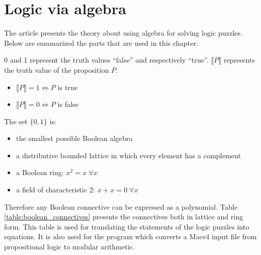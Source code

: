 \section{Logic via algebra} 

The article \cite{Ciraulo2020algebra} presents the theory about using algebra for solving logic puzzles. Below are summarized the parts that are used in this chapter.

0 and 1 represent the truth values ``false'' and respectively ``true''. $\llbracket P \rrbracket$ represents the truth value of the proposition $P$.

\begin{itemize}

\item $\llbracket P \rrbracket = 1 \iff P$ is true

\item $\llbracket P \rrbracket = 0 \iff P$ is false

\end{itemize}

The set $\{0, 1\}$ is:

\begin{itemize}

\item the smallest possible Boolean algebra

\item a distributive bounded lattice in which
every element has a complement

\item a Boolean ring: $x^2 = x \; \forall x$

\item a field of characteristic 2: $x + x = 0 \; \forall x$

\end{itemize}

Therefore any Boolean connective can be expressed as a polynomial. Table \ref{table:boolean_connectives} presents the connectives both in lattice and ring form. This table is used for translating the statements of the logic puzzles into equations. It is also used for the program which converts a Mace4 input file from propositional logic to modular arithmetic.


